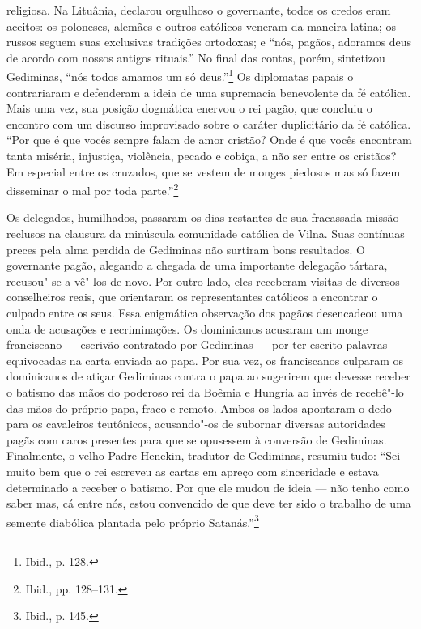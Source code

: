 religiosa. Na Lituânia, declarou orgulhoso o governante, todos os credos
eram aceitos: os poloneses, alemães e outros católicos veneram da
maneira latina; os russos seguem suas exclusivas tradições ortodoxas; e
``nós, pagãos, adoramos deus de acordo com nossos antigos rituais.'' No
final das contas, porém, sintetizou Gediminas, ``nós todos amamos um só
deus.''\footnote{Ibid., p. 128.} Os diplomatas papais o contrariaram e
defenderam a ideia de uma supremacia benevolente da fé católica. Mais
uma vez, sua posição dogmática enervou o rei pagão, que concluiu o
encontro com um discurso improvisado sobre o caráter duplicitário da fé
católica. ``Por que é que vocês sempre falam de amor cristão? Onde é que
vocês encontram tanta miséria, injustiça, violência, pecado e cobiça, a
não ser entre os cristãos? Em especial entre os cruzados, que se vestem
de monges piedosos mas só fazem disseminar o mal por toda
parte.''\footnote{Ibid., pp. 128--131.}

Os delegados, humilhados, passaram os dias restantes de sua fracassada
missão reclusos na clausura da minúscula comunidade católica de Vilna.
Suas contínuas preces pela alma perdida de Gediminas não surtiram bons
resultados. O governante pagão, alegando a chegada de uma importante
delegação tártara, recusou"-se a vê"-los de novo. Por outro lado, eles
receberam visitas de diversos conselheiros reais, que orientaram os
representantes católicos a encontrar o culpado entre os seus. Essa
enigmática observação dos pagãos desencadeou uma onda de acusações e
recriminações. Os dominicanos acusaram um monge franciscano --- escrivão
contratado por Gediminas --- por ter escrito palavras equivocadas na carta
enviada ao papa. Por sua vez, os franciscanos culparam os dominicanos de
atiçar Gediminas contra o papa ao sugerirem que devesse receber o
batismo das mãos do poderoso rei da Boêmia e Hungria ao invés de
recebê"-lo das mãos do próprio papa, fraco e remoto. Ambos os lados
apontaram o dedo para os cavaleiros teutônicos, acusando"-os de subornar
diversas autoridades pagãs com caros presentes para que se opusessem à
conversão de Gediminas. Finalmente, o velho Padre Henekin, tradutor de
Gediminas, resumiu tudo: ``Sei muito bem que o rei escreveu as cartas em
apreço com sinceridade e estava determinado a receber o batismo. Por que
ele mudou de ideia --- não tenho como saber mas, cá entre nós, estou
convencido de que deve ter sido o trabalho de uma semente diabólica
plantada pelo próprio Satanás.''\footnote{Ibid., p. 145.}

